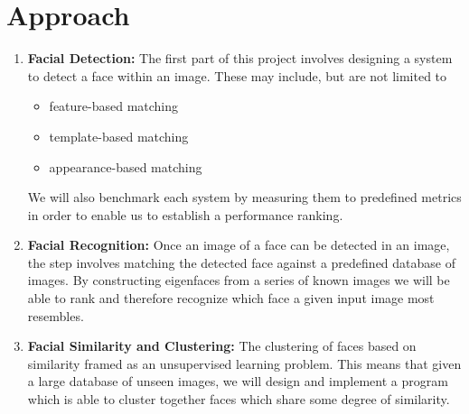 \documentclass[11pt]{article} %
\theoremstyle{plain}
\theoremstyle{definition}
\theoremstyle{remark}
\numberwithin{equation}{section} %
\numberwithin{figure}{section} %
\numberwithin{table}{section} %
\begin{document}
\section{Approach}

\begin{enumerate}
\item \textbf{Facial Detection:} The first part of this project involves designing a system to detect a face within an image. These may include, but are not limited to
  \begin{itemize}
    \item feature-based matching \citep{krivzaj2010adaptation}
    \item template-based matching
    \item appearance-based matching
  \end{itemize}
We will also benchmark each system by measuring them to predefined metrics in order to enable us to establish a performance ranking.


    \item \textbf{Facial Recognition:} 
    Once an image of a face can be detected in an image, the step involves matching the detected face against a predefined database of images. By constructing eigenfaces from a series of known images we will be able to rank and therefore recognize which face a given input image most resembles.
    
  
  
  \item \textbf{Facial Similarity and Clustering:} The clustering of faces based on similarity framed as an unsupervised learning problem. This means that given a large database of unseen images, we will design and implement a program which is able to cluster together faces which share some degree of similarity.
\end{enumerate}
\end{document}
